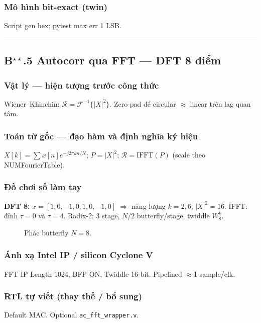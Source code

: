 \subsubsection*{Mô hình bit-exact (twin)}
Script gen hex; pytest max err 1 LSB.
\vspace{0.4cm}\hrule\vspace{0.4cm}
\subsection*{B$^{\star\star}$.5 Autocorr qua FFT --- DFT 8 điểm}
\subsubsection*{Vật lý --- hiện tượng trước công thức}
Wiener--Khinchin: $\mathcal{R}=\mathcal{F}^{-1}\{|X|^2\}$. Zero-pad để circular $\approx$ linear trên lag quan tâm.
\subsubsection*{Toán từ gốc --- đạo hàm và định nghĩa ký hiệu}
$X[k]=\sum x[n]e^{-j2\pi kn/N}$; $P=|X|^2$; $\mathcal{R}=\mathrm{IFFT}(P)$ (scale theo NUMFourierTable).
\subsubsection*{Đồ chơi số làm tay}
\textbf{DFT 8:} $x=[1,0,-1,0,1,0,-1,0]$ $\Rightarrow$ năng lượng $k=2,6$, $|X|^2=16$. IFFT: đỉnh $\tau=0$ và $\tau=4$. Radix-2: 3 stage, $N/2$ butterfly/stage, twiddle $W_8^k$.
\begin{figure}[H]\centering
{}
\caption{Phác butterfly $N=8$.}
\end{figure}
\subsubsection*{Ánh xạ Intel IP / silicon Cyclone V}
FFT IP Length 1024, BFP ON, Twiddle 16-bit. Pipelined $\approx$1 sample/clk.
\subsubsection*{RTL tự viết (thay thế / bổ sung)}
Default MAC. Optional \texttt{ac\_fft\_wrapper.v}.
